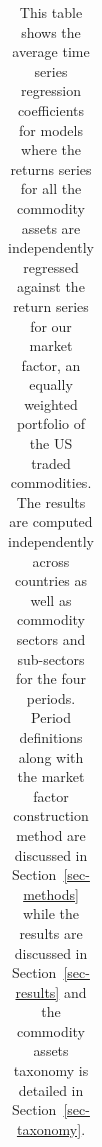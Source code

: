 \documentclass[
  authoryear,
  preprint,
  3p]{elsarticle}
\begin{document}
\begin{longtable}[t]{>{}l>{}l>{}l>{}r>{}r>{}r>{}r}

\caption{\label{tbl-regressions-index}This table shows the average time
series regression coefficients for models where the returns series for
all the commodity assets are independently regressed against the return
series for our market factor, an equally weighted portfolio of the US
traded commodities. The results are computed independently across
countries as well as commodity sectors and sub-sectors for the four
periods. Period definitions along with the market factor construction
method are discussed in Section~\ref{sec-methods} while the results are
discussed in Section~\ref{sec-results} and the commodity assets taxonomy
is detailed in Section~\ref{sec-taxonomy}.}

\tabularnewline


\end{longtable}
\end{document}
